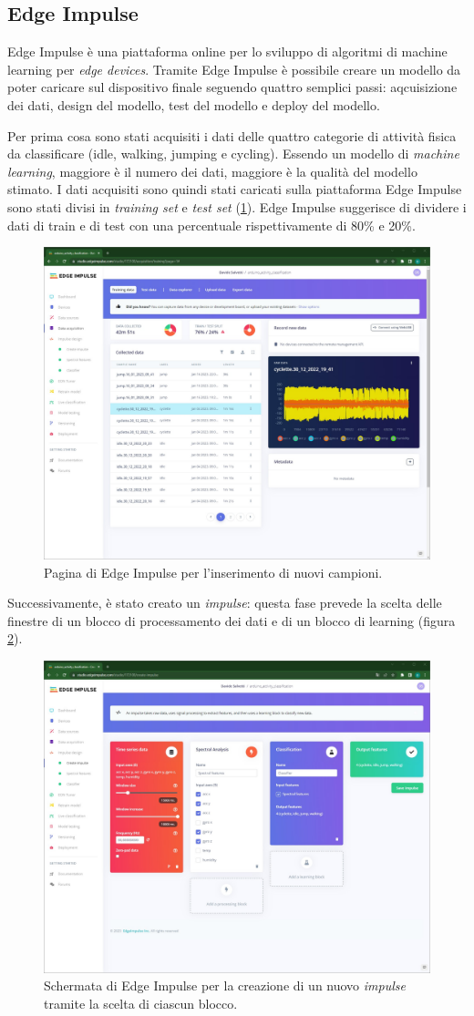 \subsection{Edge Impulse}
Edge Impulse è una piattaforma online per lo sviluppo di algoritmi di machine learning per \textit{edge devices}. Tramite Edge Impulse è possibile creare un modello da poter caricare sul dispositivo finale seguendo quattro semplici passi: aqcuisizione dei dati, design del modello, test del modello e deploy del modello. 

Per prima cosa sono stati acquisiti i dati delle quattro categorie di attività fisica da classificare (idle, walking, jumping e cycling). Essendo un modello di \textit{machine learning}, maggiore è il numero dei dati, maggiore è la qualità del modello stimato. I dati acquisiti sono  quindi stati caricati sulla piattaforma Edge Impulse sono stati divisi in \textit{training set} e \textit{test set} (\Fig\ref{fig:acquisizione_dati}). Edge Impulse suggerisce di dividere i dati di train e di test con una percentuale rispettivamente di 80\% e 20\%.
\begin{figure}[h!]
	\centering
	\includegraphics[width=0.5\linewidth]{./ImageFiles/data_acquisition.jpg}
	\caption{Pagina di Edge Impulse per l'inserimento di nuovi campioni.}
	\label{fig:acquisizione_dati}
\end{figure}
Successivamente, è stato creato un \textit{impulse}: questa fase prevede la scelta delle finestre di un blocco di processamento dei dati e di un blocco di learning (figura \ref{fig:creazione_impulse}).
\begin{figure}[h!]
	\centering
	\includegraphics[width=0.5\linewidth]{./ImageFiles/creazione_impulse.jpg}
	\caption{Schermata di Edge Impulse per la creazione di un nuovo \textit{impulse} tramite la scelta di ciascun blocco.}
	\label{fig:creazione_impulse}
\end{figure}

